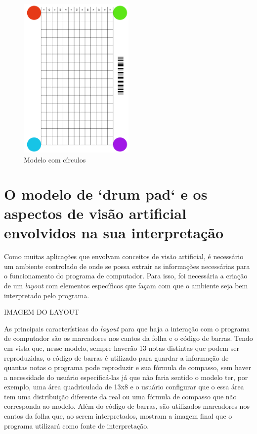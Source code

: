 \documentclass[12pt]{report}
\begin{document}
\begin{figure}[H]
  \centering
    \includegraphics[angle=90,origin=c,width=0.5\textwidth]{imagens/circulos.png}
    \caption{Modelo com círculos}
  \label{fig:circulos}
\end{figure}



\chapter{O modelo de `drum pad` e os aspectos de visão artificial
  envolvidos na sua interpretação}
\label{cha:cha1}

Como muitas aplicações que envolvam conceitos de visão artificial, é
necessário um ambiente controlado de onde se possa extrair as
informações necessárias para o funcionamento do programa de
computador. Para isso, foi necessária a criação de um {\it layout} com
elementos específicos que façam com que o ambiente seja bem
interpretado pelo programa.

IMAGEM DO LAYOUT

As principais características do {\it layout} para que haja a
interação com o programa de computador são os marcadores nos cantos da
folha e o código de barras. Tendo em vista que, nesse modelo, sempre
haverão 13 notas distintas que podem ser reproduzidas, o código de
barras é utilizado para guardar a informação de quantas notas o
programa pode reproduzir e sua fórmula de compasso, sem haver a
necessidade do usuário especificá-las já que não faria sentido o
modelo ter, por exemplo, uma área quadriculada de 13x8 e o usuário
configurar que o essa área tem uma distribuição diferente da real ou
uma fórmula de compasso que não corresponda ao modelo. Além do código
de barras, são utilizados marcadores nos cantos da folha que, ao serem
interpretados, mostram a imagem final que o programa utilizará como
fonte de interpretação.
\end{document}

